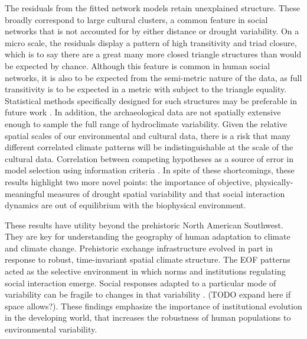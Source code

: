 \documentclass[11pt]{iopart}
\begin{document}
The residuals from the fitted network models retain unexplained structure. These broadly correspond to large cultural clusters, a common feature in social networks that is not accounted for by either distance or drought variability. On a micro scale, the residuals display a pattern of high transitivity and triad closure, which is to say there are a great many more closed triangle structures than would be expected by chance. Although this feature is common in human social networks, it is also to be expected from the semi-metric nature of the data, as full transitivity is to be expected in a metric with subject to the triangle equality. Statistical methods specifically designed for such structures may be preferable in future work \parencite{Stillman2017}. In addition, the archaeological data are not spatially extensive enough to sample the full range of hydroclimate variability. Given the relative spatial scales of our environmental and cultural data, there is a risk that many different correlated climate patterns will be indistinguishable at the scale of the cultural data. Correlation between competing hypotheses as a source of error in model selection using information criteria \parencite{Shirk2018}. In spite of these shortcomings, these results highlight two more novel points: the importance of objective, physically-meaningful measures of drought spatial variability and that social interaction dynamics are out of equilibrium with the biophysical environment. 

These results have utility beyond the prehistoric North American Southwest. They are key for understanding the geography of human adaptation to climate and climate change. Prehistoric exchange infrastructure evolved in part in response to robust, time-invariant spatial climate structure. The EOF patterns acted as the selective environment in which norms and institutions regulating social interaction emerge. Social responses adapted to a particular mode of variability can be fragile to changes in that variability \parencite{Janssen2007}. (TODO expand here if space allows?). These findings emphasize the importance of institutional evolution in the developing world, that increases the robustness of human populations to environmental variability.


\end{document}
